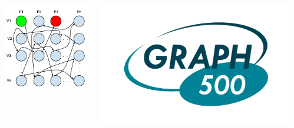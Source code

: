 \documentclass[final]{beamer} %
\begin{document}
\begin{frame}[t]
\begin{columns}[t]
\begin{column}{0.60\paperwidth}
\begin{columns}[t,totalwidth=0.60\paperwidth]
\begin{column}{0.28\paperwidth}
\begin{columns}[t,totalwidth=0.28\paperwidth]
\begin{column}{0.12\paperwidth}
								\begin{center} \includegraphics[width=0.12\paperwidth]{img/linked_list/rand_proc_rand_node} \end{center}
							\end{column}
							\begin{column}{0.12\paperwidth}
								\begin{center} \includegraphics[width=0.12\paperwidth]{img/logo_graph500} \end{center}
							\end{column}
						\end{columns}
					\end{column}
					\begin{column}{0.28\paperwidth}

\end{column}
\end{columns}
\end{column}
\end{columns}
\end{frame}
\end{document}
